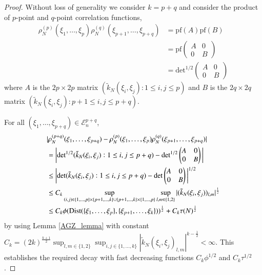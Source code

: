 \documentclass[11pt,reqno]{amsproc}
\numberwithin{equation}{section}
\numberwithin{theorem}{section}
\begin{document}
\begin{proof}
Without loss of generality we consider $k=p+q$ and consider the product of $p$-point and $q$-point correlation functions,
\begin{align*}
\rho_N^{(p)}(\xi_1, \ldots, \xi_{p}) \rho_N^{(q)}(\xi_{p+1}, \ldots, \xi_{p+q})  & = 
\mathrm{pf}(A) \mathrm{pf}(B) \\
 & = \text{pf}\left(\begin{matrix} A & 0 \\
0 & B 
\end{matrix}\right) \\
& = \text{det}^{1/2}\left(\begin{matrix} A & 0 \\
0 & B 
\end{matrix}\right)
\end{align*}
where $A$ is the $2p \times 2p$ matrix $(\tilde{k}_{N}(\xi_i, \xi_j):1\leq i, j \leq p)$ and $B$ is the 
$2q \times 2q$ matrix $(\tilde{k}_{N}(\xi_i, \xi_j):p+1\leq i, j \leq p+q)$. 

For all $(\xi_1, \ldots, \xi_{p+q}) \in \mathcal{E}_n^{p+q}$,
\begin{align*}
& \lvert \rho_N^{(p+q)}(\xi_1, \ldots, \xi_{p+q}) - \rho_N^{(p)}(\xi_1, \ldots, \xi_{p}) \rho_N^{(q)}(\xi_{p+1}, \ldots, \xi_{p+q})  \rvert \\
& =\bigg{\lvert} \text{det}^{1/2}(\tilde{k}_{N}(\xi_i, \xi_j):1\leq i, j \leq p+q) - \text{det}^{1/2}\left(\begin{matrix} A & 0 \\
0 & B 
\end{matrix}\right)
 \bigg{\rvert} \\
& \leq \bigg \lvert \text{det}(\tilde{k}_{N}(\xi_i, \xi_j):1\leq i, j \leq p+q) - \text{det}\left(\begin{matrix} A & 0 \\
0 & B 
\end{matrix}\right)
 \bigg\rvert^{1/2} \\
 & \leq C_{k}
 \sup_{(i,j) \in \{1,\ldots,p\} \times \{p+1,\ldots,k\} \cup \{p+1,\ldots,k\} \times \{1,\ldots,p\} }
\sup_{l,m \in \{1,2\}}|(\tilde{k}_{N}(\xi_i, \xi_j))_{l,m}|^{\frac{1}{2}} \\
& \leq C_{k}\phi(\mathrm{Dist}(\{\xi_1,\ldots,\xi_p\},\{\xi_{p+1},\ldots,\xi_k\}))^{\frac{1}{2}} + C_{k}\tau(N)^{\frac{1}{2}}
\end{align*}
by using Lemma \ref{AGZ_lemma} with constant $C_{k}=(2k)^{\frac{k+1}{2}}\sup_{l,m \in \{1,2\}}\sup_{i,j \in \{1,\ldots,k\}}|\tilde{k}_{N}(\xi_i, \xi_j)_{l,m}
|^{k - \frac{1}{2}} < \infty$. This establishes the required decay with fast decreasing functions $C_k \phi^{1/2}$ and $C_k \tau^{1/2}$.
\end{proof}
\end{document}
